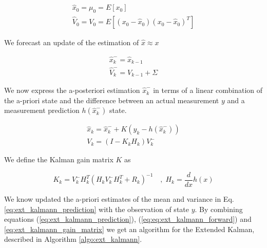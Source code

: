 \documentclass[mscthesis]{usiinfthesis}
\begin{document}
\begin{eqfloat}
\begin{equation}
\begin{array}{l}
\hat{x}_0 = \mu_0 = E[x_0] \\
\hat{V}_0 = V_0 = E[(x_0-\hat{x}_0)(x_0-\hat{x}_0)^T] 
\end{array}
\label{eq:kalman_init}
\end{equation}
\end{eqfloat}

\noindent We forecast an update of the estimation of $\hat{x} \approx x$

\begin{eqfloat}[H]
\begin{equation}
\begin{array}{l}
\hat{x}_k^- = \hat{x}_{k-1} \\
\hat{V}_k^- =  V_{k-1} + \Sigma
\end{array}
\end{equation}
\label{eq:ext_kalmann_prediction}
\end{eqfloat}

\noindent We now express the a-posteriori estimation $\hat{x}_k^-$ in terms of a linear combination of the a-priori state and the difference between an actual measurement $y$ and a measurement prediction $h(\hat{x}_k^-)$ state. 

\begin{eqfloat}[H]
\begin{equation}
\begin{array}{l}
\hat{x}_k = \hat{x}_k^- + K (y_k - h(\hat{x}_k^-)) \\
V_k = (I-K_k H_k)V_k^-
\end{array}
\end{equation}
\label{eq:ext_kalmann_forward}
\end{eqfloat}


\noindent We define the Kalman gain matrix $K$ as 
\begin{eqfloat}[H]
\begin{equation}
K_k = V_k^- H^T_k (H_k V_k^- H^T_k + R_k)^{-1}  \quad , \; H_k = \frac{d}{dx} h(x)
\end{equation}
\label{eq:ext_kalmann_gain_matrix}
\end{eqfloat}
%
%
\noindent We know updated the a-priori estimates of the mean and variance in Eq. \ref{eq:ext_kalmann_prediction} with the observation of state $y$. By combining equations (\ref{eq:ext_kalmann_prediction}), (\ref{eq:eq:ext_kalmann_forward}) and \ref{eq:ext_kalmann_gain_matrix} we get an algorithm for the Extended Kalman, described in Algorithm \ref{algo:ext_kalmann}. \\
\end{document}
